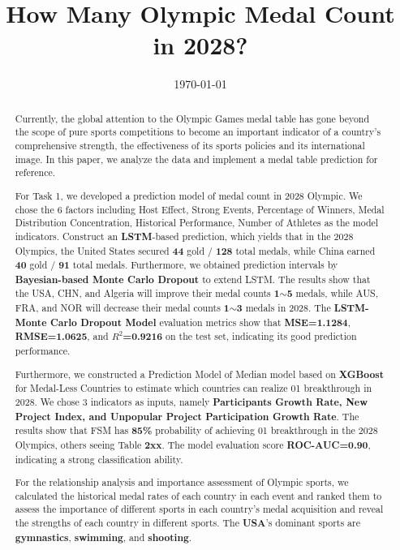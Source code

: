 \documentclass{mcmthesis}
\title{How Many Olympic Medal Count in 2028?}
\date{\today}
\begin{document}
\begin{abstract}
	
	Currently, the global attention to the Olympic Games medal table has gone beyond the scope of pure sports competitions to become an important indicator of a country's comprehensive strength, the effectiveness of its sports policies and its international image. In this paper, we analyze the data and implement a medal table prediction for reference.
	
	For Task 1, we developed a prediction model of medal count in 2028 Olympic. We chose the 6 factors including Host Effect, Strong Events, Percentage of Winners, Medal Distribution Concentration, Historical Performance, Number of Athletes as the model indicators. Construct an \textbf{LSTM}-based prediction, which yields that in the 2028 Olympics, the United States secured \textbf{44} gold / \textbf{128} total medals, while China earned \textbf{40} gold / \textbf{91} total medals. Furthermore, we obtained prediction intervals by \textbf{Bayesian-based Monte Carlo Dropout} to extend LSTM. The results show that the USA, CHN, and Algeria will improve their medal counts \textbf{1$\sim$5} medals, while AUS, FRA, and NOR will decrease their medal counts \textbf{1$\sim$3} medals in 2028. The \textbf{LSTM-Monte Carlo Dropout Model} evaluation metrics show that \textbf{MSE=1.1284}, \textbf{RMSE=1.0625}, and \textbf{$R^2$=0.9216} on the test set, indicating its good prediction performance.
	
	Furthermore, we constructed a Prediction Model of Median model based on \textbf{XGBoost} for Medal-Less Countries to estimate which countries can realize 01 breakthrough  in 2028. We chose 3 indicators as inputs, namely \textbf{Participants Growth Rate, New Project Index, and Unpopular Project Participation Growth Rate}. The results show that FSM has\textbf{ 85\%} probability of achieving 01 breakthrough in the 2028 Olympics, others seeing Table \textbf{2xx}. The model evaluation score \textbf{ROC-AUC=0.90}, indicating a strong classification ability. 
	
	
	For the relationship analysis and importance assessment of Olympic sports, we calculated the historical medal rates of each country in each event and ranked them to assess the importance of different sports in each country's medal acquisition and reveal the strengths of each country in different sports. The \textbf{USA}'s dominant sports are \textbf{gymnastics}, \textbf{swimming}, and \textbf{shooting}.
	

\end{abstract}
\end{document}
